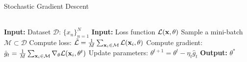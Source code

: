\begin{algorithm}
	\caption{Stochastic Gradient Descent}
	\label{alg:sgd_train}
	\begin{algorithmic}
  \\\hrulefill
\State \hskip-3mm  {\bfseries Input:} { Dataset $\mathcal{D}: \,\{x_n\}_{n=1}^N$}
\State \hskip-3mm  {\bfseries Input:} { Loss function $\mathcal{L}({\mathbf{x}}, \theta)$}
            \State Sample a mini-batch $\mathcal{M} \subset \mathcal{D}$
            \State Compute loss: $ \tilde{\mathcal{L}} = \frac1M \sum_{{\mathbf{x}}_i \in \mathcal{M}} \mathcal{L}({\mathbf{x}}_i, \theta)$
		\State Compute gradient: $\hat{g}_t = \frac1M \sum_{{\mathbf{x}}_i \in \mathcal{M}} \nabla_{\theta} \mathcal{L}({\mathbf{x}}_i, \theta^t)$
		\State Update parameters: $\theta^{t+1} = \theta^{t} - \eta_t \hat{g}_t $
		\EndWhile
            \State \hskip-3mm  {\bfseries Output:} $\theta^*$
	\end{algorithmic}
\end{algorithm}


